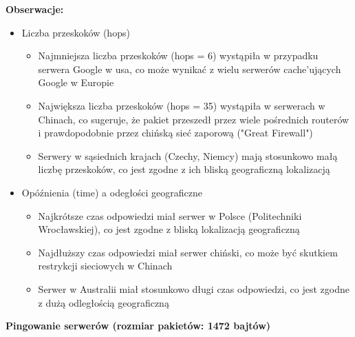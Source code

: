\documentclass{article}
\begin{document}
\vspace{1\baselineskip}
\textbf{Obserwacje:}
\vspace{1\baselineskip}
\begin{itemize}
    \item Liczba przeskoków (hops)
    \begin{itemize}
        \item Najmniejsza liczba przeskoków (hops = 6) wystąpiła w przypadku serwera Google w usa, co może wynikać z wielu serwerów cache'ujących Google w Europie
        \item Największa liczba przeskoków (hops = 35) wystąpiła w serwerach w Chinach, co sugeruje, że pakiet przeszedł przez wiele pośrednich routerów i
        prawdopodobnie przez chińską sieć zaporową ("Great Firewall")
        \item Serwery w sąsiednich krajach (Czechy, Niemcy) mają stosunkowo małą liczbę przeskoków, co jest zgodne z ich bliską geograficzną lokalizacją
    \end{itemize}
    \item Opóźnienia (time) a odegłości geograficzne
    \begin{itemize}
        \item Najkrótsze czas odpowiedzi miał serwer w Polsce (Politechniki Wrocławskiej), co jest zgodne z bliską lokalizacją geograficzną
        \item Najdłuższy czas odpowiedzi miał serwer chiński, co może być skutkiem restrykcji sieciowych w Chinach
        \item Serwer w Australii miał stosunkowo długi czas odpowiedzi, co jest zgodne z dużą odległością geograficzną
    \end{itemize}
\end{itemize}
\vspace{1\baselineskip}
\textbf{Pingowanie serwerów (rozmiar pakietów: 1472 bajtów)}
\vspace{1\baselineskip}
\end{document}
